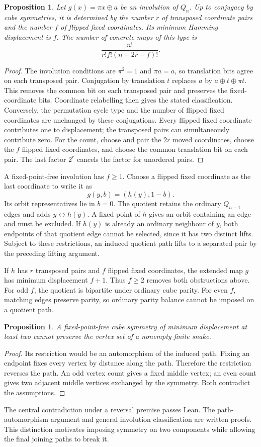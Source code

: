 \documentclass[11pt,a4paper]{article}
\newtheorem{proposition}[theorem]{Proposition}
\theoremstyle{definition}
\theoremstyle{remark}
\begin{document}
\begin{proposition}
Let $g(x)=\pi x\oplus a$ be an involution of $Q_n$. Up to conjugacy by
cube symmetries, it is determined by the number $r$ of transposed coordinate
pairs and the number $f$ of flipped fixed coordinates. Its minimum
Hamming displacement is $f$. The number of concrete maps of this type is
\[
\frac{n!}{r!f!(n-2r-f)!}.
\]
\end{proposition}
\begin{proof}
The involution conditions are $\pi^2=1$ and $\pi a=a$, so translation
bits agree on each transposed pair. Conjugation by translation $t$
replaces $a$ by $a\oplus t\oplus\pi t$. This removes the common bit
on each transposed pair and preserves the fixed-coordinate bits.
Coordinate relabelling then gives the stated classification. Conversely,
the permutation cycle type and the number of flipped fixed coordinates
are unchanged by these conjugations.
Every flipped fixed coordinate contributes one to displacement; the
transposed pairs can simultaneously contribute zero. For the count,
choose and pair the $2r$ moved coordinates, choose the $f$ flipped fixed
coordinates, and choose the common translation bit on each pair.
The last factor $2^r$ cancels the factor for unordered pairs.
\end{proof}

A fixed-point-free involution has $f\ge1$. Choose a flipped fixed
coordinate as the last coordinate to write it as
\[
g(y,b)=(h(y),1-b).
\]
Its orbit representatives lie in $b=0$. The quotient retains the ordinary
$Q_{n-1}$ edges and adds $y\leftrightarrow h(y)$. A fixed point of $h$
gives an orbit containing an edge and must be excluded. If $h(y)$ is
already an ordinary neighbour of $y$, both endpoints of that quotient
edge cannot be selected, since it has two distinct lifts. Subject to
these restrictions, an induced quotient path lifts to a separated pair
by the preceding lifting argument.

If $h$ has $r$ transposed pairs and $f$ flipped fixed coordinates, the
extended map $g$ has minimum displacement $f+1$. Thus $f\ge2$ removes
both obstructions above. For odd $f$, the quotient is bipartite under
ordinary cube parity. For even $f$, matching edges preserve parity,
so ordinary parity balance cannot be imposed on a quotient path.

\begin{proposition}
A fixed-point-free cube symmetry of minimum displacement at least two
cannot preserve the vertex set of a nonempty finite snake.
\end{proposition}
\begin{proof}
Its restriction would be an automorphism of the induced path. Fixing an
endpoint fixes every vertex by distance along the path. Therefore the
restriction reverses the path. An odd vertex count gives a fixed middle
vertex; an even count gives two adjacent middle vertices exchanged by
the symmetry. Both contradict the assumptions.
\end{proof}
The central contradiction under a reversal premise passes Lean. The
path-automorphism argument and general involution classification are
written proofs. This distinction motivates imposing symmetry on two
components while allowing the final joining paths to break it.
\end{document}
